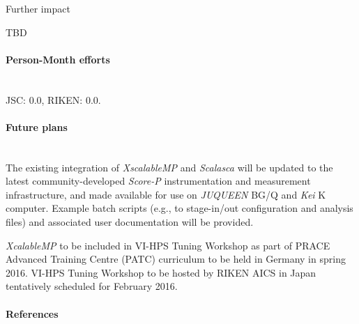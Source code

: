 \begin{refsection}
Further impact
\begin{itemize*}
    \item TBD
\end{itemize*}

\paragraph{Person-Month efforts}~\\


JSC: 0.0, RIKEN: 0.0.

\paragraph{Future plans}~\\


The existing integration of \textit{XscalableMP} and \textit{Scalasca}
will be updated to the latest community-developed \textit{Score-P}
instrumentation and measurement infrastructure, and made available for
use on \textit{JUQUEEN} BG/Q and \textit{Kei} K computer.  Example batch
scripts (e.g., to stage-in/out configuration and analysis files) and
associated user documentation will be provided.

\textit{XcalableMP} to be included in VI-HPS Tuning Workshop as part of
PRACE Advanced Training Centre (PATC) curriculum to be held in Germany in spring 2016.
VI-HPS Tuning Workshop to be hosted by RIKEN AICS in Japan
tentatively scheduled for February 2016.

\paragraph{References}~\\


\printbibliography[heading=none,notkeyword=own]

\end{refsection}
